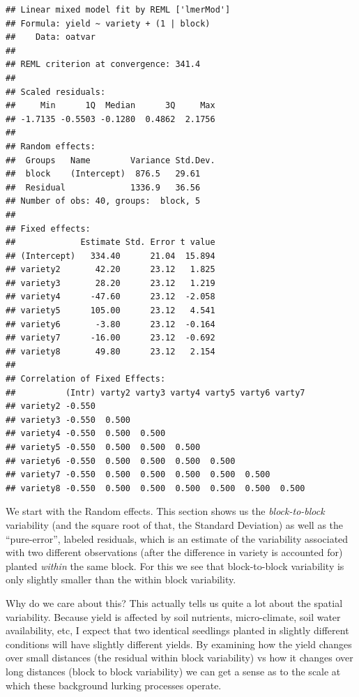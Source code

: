 \documentclass[]{book}
\theoremstyle{definition}
\theoremstyle{definition}
\theoremstyle{remark}
\begin{document}
\begin{verbatim}
## Linear mixed model fit by REML ['lmerMod']
## Formula: yield ~ variety + (1 | block)
##    Data: oatvar
## 
## REML criterion at convergence: 341.4
## 
## Scaled residuals: 
##     Min      1Q  Median      3Q     Max 
## -1.7135 -0.5503 -0.1280  0.4862  2.1756 
## 
## Random effects:
##  Groups   Name        Variance Std.Dev.
##  block    (Intercept)  876.5   29.61   
##  Residual             1336.9   36.56   
## Number of obs: 40, groups:  block, 5
## 
## Fixed effects:
##             Estimate Std. Error t value
## (Intercept)   334.40      21.04  15.894
## variety2       42.20      23.12   1.825
## variety3       28.20      23.12   1.219
## variety4      -47.60      23.12  -2.058
## variety5      105.00      23.12   4.541
## variety6       -3.80      23.12  -0.164
## variety7      -16.00      23.12  -0.692
## variety8       49.80      23.12   2.154
## 
## Correlation of Fixed Effects:
##          (Intr) varty2 varty3 varty4 varty5 varty6 varty7
## variety2 -0.550                                          
## variety3 -0.550  0.500                                   
## variety4 -0.550  0.500  0.500                            
## variety5 -0.550  0.500  0.500  0.500                     
## variety6 -0.550  0.500  0.500  0.500  0.500              
## variety7 -0.550  0.500  0.500  0.500  0.500  0.500       
## variety8 -0.550  0.500  0.500  0.500  0.500  0.500  0.500
\end{verbatim}

We start with the Random effects. This section shows us the
\emph{block-to-block} variability (and the square root of that, the
Standard Deviation) as well as the ``pure-error'', labeled residuals,
which is an estimate of the variability associated with two different
observations (after the difference in variety is accounted for) planted
\emph{within} the same block. For this we see that block-to-block
variability is only slightly smaller than the within block variability.

Why do we care about this? This actually tells us quite a lot about the
spatial variability. Because yield is affected by soil nutrients,
micro-climate, soil water availability, etc, I expect that two identical
seedlings planted in slightly different conditions will have slightly
different yields. By examining how the yield changes over small
distances (the residual within block variability) vs how it changes over
long distances (block to block variability) we can get a sense as to the
scale at which these background lurking processes operate.
\end{document}
